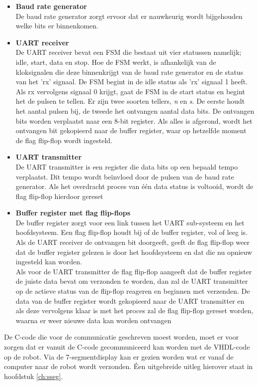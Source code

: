 \documentclass{report}
\begin{document}
\begin{itemize}
\item  \textbf{Baud rate generator}\\
\newline
De baud rate generator zorgt ervoor dat er nauwkeurig wordt bijgehouden welke bits er binnenkomen.

\item \textbf{UART receiver}\\

De UART receiver bevat een FSM die bestaat uit vier statussen namelijk; idle, start, data en stop.
Hoe de FSM werkt, is afhankelijk van de kloksignalen die deze binnenkrijgt van de baud rate generator en de status van het 'rx' signaal.
De FSM begint in de idle status als 'rx' signaal 1 heeft.
Als rx vervolgens signaal 0 krijgt, gaat de FSM in de start status en begint het de pulsen te tellen.
Er zijn twee soorten tellers, \textit{n} en \textit{s}.
De eerste houdt het aantal pulsen bij, de tweede het ontvangen aantal data bits.
De ontvangen bits worden verplaatst naar een 8-bit register.
Als alles is afgerond, wordt het ontvangen bit gekopieerd naar de buffer register, waar op hetzelfde moment de flag flip-flop wordt ingesteld.
 
 \item \textbf{UART transmitter}\\

 De UART transmitter is een register die data bits op een bepaald tempo verplaatst.
Dit tempo wordt beïnvloed door de pulsen van de baud rate generator.
Als het overdracht proces van één data status is voltooid, wordt de flag flip-flop hierdoor gereset
 
 \item \textbf{Buffer register met flag flip-flops}\\

 De buffer register zorgt voor een link tussen het UART sub-systeem en het hoofdsysteem.
Een flag flip-flop houdt bij of de buffer register, vol of leeg is.\\

Als de UART receiver de ontvangen bit doorgeeft, geeft de flag flip-flop weer dat de buffer register gelezen is door het hoofdsysteem en dat die nu opnieuw ingesteld kan worden.\\

Als voor de UART transmitter de flag flip-flop aangeeft dat de buffer register de juiste data bevat om verzonden te worden, dan zal de UART transmitter op de actieve status van de flip-flop reageren en beginnen met verzenden.
De data van de buffer register wordt gekopieerd naar de UART transmitter en als deze vervolgens klaar is met het proces zal de flag flip-flop gereset worden, waarna er weer nieuwe data kan worden ontvangen 
 
\end{itemize}
De C-code die voor de communicatie geschreven moest worden, moet er voor zorgen dat er vanuit de C-code gecommuniceerd kan worden met de VHDL-code op de robot.
Via de 7-segmentdisplay kan er gezien worden wat er vanaf de computer naar de robot wordt verzonden. Éen uitgebreide uitleg hierover staat in hoofdstuk \ref{ch:sseg}.
\end{document}
